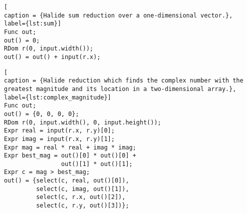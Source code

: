 \begin{lstlisting}[
caption = {Halide sum reduction over a one-dimensional vector.}, label={lst:sum}]
Func out;
out() = 0;
RDom r(0, input.width());
out() = out() + input(r.x);
\end{lstlisting}

\begin{lstlisting}[
caption = {Halide reduction which finds the complex number with the greatest magnitude and its location in a two-dimensional array.}, label={lst:complex_magnitude}]
Func out;
out() = {0, 0, 0, 0};
RDom r(0, input.width(), 0, input.height());
Expr real = input(r.x, r.y)[0];
Expr imag = input(r.x, r.y)[1];
Expr mag = real * real + imag * imag;
Expr best_mag = out()[0] * out()[0] +
                out()[1] * out()[1];
Expr c = mag > best_mag;
out() = {select(c, real, out()[0]),
         select(c, imag, out()[1]),
         select(c, r.x, out()[2]),
         select(c, r.y, out()[3])};
\end{lstlisting}
